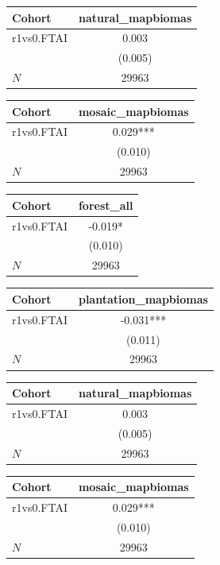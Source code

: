 {
\def\sym#1{\ifmmode^{#1}\else\(^{#1}\)\fi}
\begin{tabular}{l*{1}{c}}
\toprule
Cohort    &natural\_mapbiomas   \\
\midrule
r1vs0.FTAI&    0.003   \\
          &  (0.005)   \\
\midrule
\(N\)     &    29963   \\
\bottomrule
\end{tabular}
}
{
\def\sym#1{\ifmmode^{#1}\else\(^{#1}\)\fi}
\begin{tabular}{l*{1}{c}}
\toprule
Cohort    &mosaic\_mapbiomas   \\
\midrule
r1vs0.FTAI&    0.029***\\
          &  (0.010)   \\
\midrule
\(N\)     &    29963   \\
\bottomrule
\end{tabular}
}
{
\def\sym#1{\ifmmode^{#1}\else\(^{#1}\)\fi}
\begin{tabular}{l*{1}{c}}
\toprule
Cohort    &forest\_all   \\
\midrule
r1vs0.FTAI&   -0.019*  \\
          &  (0.010)   \\
\midrule
\(N\)     &    29963   \\
\bottomrule
\end{tabular}
}
{
\def\sym#1{\ifmmode^{#1}\else\(^{#1}\)\fi}
\begin{tabular}{l*{1}{c}}
\toprule
Cohort    &plantation\_mapbiomas   \\
\midrule
r1vs0.FTAI&   -0.031***\\
          &  (0.011)   \\
\midrule
\(N\)     &    29963   \\
\bottomrule
\end{tabular}
}
{
\def\sym#1{\ifmmode^{#1}\else\(^{#1}\)\fi}
\begin{tabular}{l*{1}{c}}
\toprule
Cohort    &natural\_mapbiomas   \\
\midrule
r1vs0.FTAI&    0.003   \\
          &  (0.005)   \\
\midrule
\(N\)     &    29963   \\
\bottomrule
\end{tabular}
}
{
\def\sym#1{\ifmmode^{#1}\else\(^{#1}\)\fi}
\begin{tabular}{l*{1}{c}}
\toprule
Cohort    &mosaic\_mapbiomas   \\
\midrule
r1vs0.FTAI&    0.029***\\
          &  (0.010)   \\
\midrule
\(N\)     &    29963   \\
\bottomrule
\end{tabular}
}
